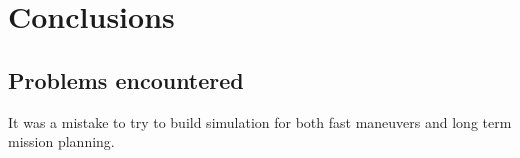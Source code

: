 \section{Conclusions}\label{sec:conclusions}

    \subsection{Problems encountered}
        It was a mistake to try to build simulation for both fast maneuvers and long term mission planning.